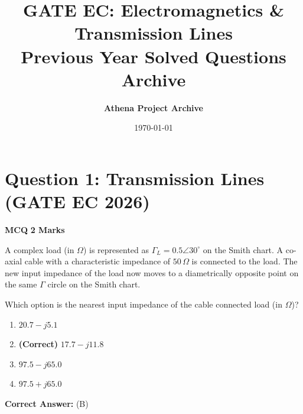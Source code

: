 \documentclass[11pt,a4paper]{article}
\title{\Huge\bfseries GATE EC: Electromagnetics \& Transmission Lines\\[0.3em] \Large Previous Year Solved Questions Archive}
\author{\textbf{Athena Project Archive}}
\date{\today}
\begin{document}
\maketitle
\tableofcontents
\newpage


\section*{Question 1: Transmission Lines (GATE EC 2026)}
\noindent \textbf{\color{primary}MCQ} \hfill \textbf{\color{secondary}2 Marks}


\noindent A complex load (in $\Omega$) is represented as $\Gamma_L = 0.5\angle30^\circ$ on the Smith chart. A co-axial cable with a characteristic impedance of $50 \, \Omega$ is connected to the load. The new input impedance of the load now moves to a diametrically opposite point on the same $\Gamma$ circle on the Smith chart. 

Which option is the nearest input impedance of the cable connected load (in $\Omega$)?


\begin{enumerate}[label=(\Alph*)]
    \item $20.7 - j5.1$
    \item \textbf{(Correct)} $17.7 - j11.8$
    \item $97.5 - j65.0$
    \item $97.5 + j65.0$
\end{enumerate}

\noindent \textbf{Correct Answer:} (B)
\end{document}
